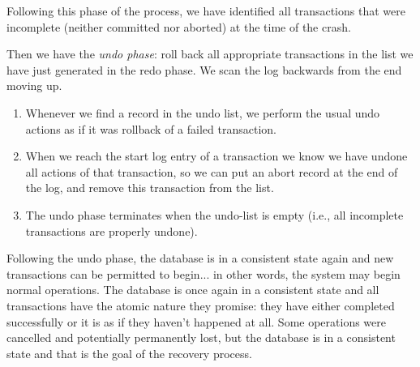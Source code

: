 Following this phase of the process, we have identified all transactions that were incomplete (neither committed nor aborted) at the time of the crash. 

Then we have the \textit{undo phase}: roll back all appropriate transactions in the list we have just generated in the redo phase. We scan the log backwards from the end moving up.

\begin{enumerate}
	\item Whenever we find a record in the undo list, we perform the usual undo actions as if it was rollback of a failed transaction.
	\item When we reach the start log entry of a transaction we know we have undone all actions of that transaction, so we can put an abort record at the end of the log, and remove this transaction from the list.
	\item The undo phase terminates when the undo-list is empty (i.e., all incomplete transactions are properly undone).
\end{enumerate}

Following the undo phase, the database is in a consistent state again and new transactions can be permitted to begin... in other words, the system may begin normal operations. The database is once again in a consistent state and all transactions have the atomic nature they promise: they have either completed successfully or it is as if they haven't happened at all. Some operations were cancelled and potentially permanently lost, but the database is in a consistent state and that is the goal of the recovery process.




